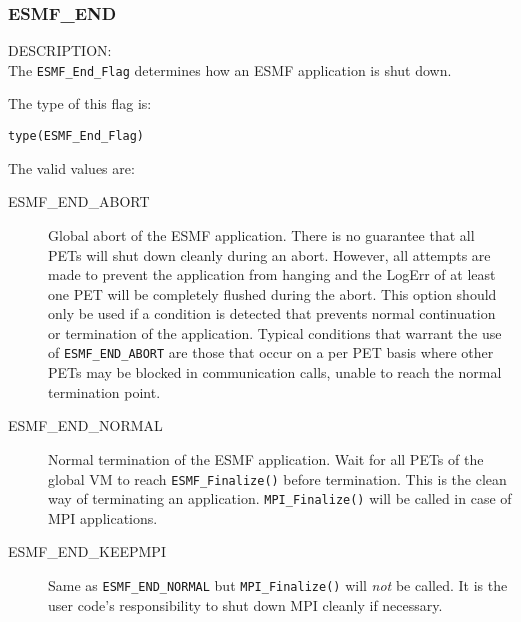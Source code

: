 
\subsubsection{ESMF\_END}
\label{const:endflag}

{\sf DESCRIPTION:\\}
The {\tt ESMF\_End\_Flag} determines how an ESMF application is shut down.

The type of this flag is:

{\tt type(ESMF\_End\_Flag)}

The valid values are:
\begin{description}
   \item [ESMF\_END\_ABORT] 
         Global abort of the ESMF application. There is no guarantee 
         that all PETs will shut down cleanly during an abort. However, all
         attempts are made to prevent the application from hanging and the
         LogErr of at least one PET will be completely flushed during the abort.
         This option should only be used if a condition is detected that
         prevents normal continuation or termination of the application.
         Typical conditions that warrant the use of {\tt ESMF\_END\_ABORT} are those
         that occur on a per PET basis where other PETs may be blocked in 
         communication calls, unable to reach the normal termination point.
   \item [ESMF\_END\_NORMAL]
         \begin{sloppypar}
         Normal termination of the ESMF application. Wait for all PETs of the
         global VM to reach 
	{\tt ESMF\_Finalize()} before termination. This is
         the clean way of terminating an application. {\tt MPI\_Finalize()} will
         be called in case of MPI applications.
         \end{sloppypar}
   \item [ESMF\_END\_KEEPMPI]
         Same as {\tt ESMF\_END\_NORMAL} but {\tt MPI\_Finalize()} will {\em not}
         be called. It is the user code's responsibility to shut down MPI
         cleanly if necessary.
\end{description}
